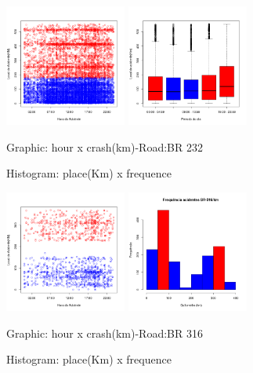 \documentclass[conference,compsoc]{IEEEtran}
\begin{document}
\begin{figure}[ht]
\begin{center}
     \includegraphics[height=4.0cm]{graficos/br232_1.png}
     \includegraphics[height=4.0cm]{graficos/br232_2.png}
      \caption{Graphic: hour x crash(km)-Road:BR 232}
      \caption{Histogram: place(Km) x frequence}
\end{center}
\end{figure}

\begin{figure}[ht]
\begin{center}
     \includegraphics[height=4.0cm]{graficos/br316_1.png}
     \includegraphics[height=4.0cm]{graficos/br316_2.png}
      \caption{Graphic: hour x crash(km)-Road:BR 316}
      \caption{Histogram: place(Km) x frequence}
\end{center}
\end{figure}
\end{document}
